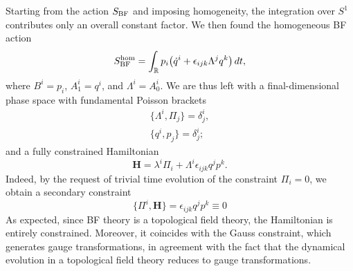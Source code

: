 \documentclass{article}
\numberwithin{equation}{section}
\theoremstyle{definition}
\begin{document}
\smallskip

Starting from the action $S_{\rm BF}$ and imposing homogeneity, the integration over $S^1$ contributes only an overall constant factor. We then found the homogeneous BF action
\begin{equation}
    S_{\rm BF}^{\rm hom}=\int_{\mathbb{R}} p_i\bigl(\dot q^i+\epsilon_{ijk}\Lambda^jq^k\bigr)\,dt,
\end{equation}
where $B^i=p_i$, $A^i_1=q^i$, and $\Lambda^i=A^i_0$. We are thus left with a final-dimensional phase space with fundamental Poisson brackets
\begin{equation}
    \begin{split}
        \{\Lambda^i,\Pi_j\}=\delta^i_j,\\
\{q^i,p_j\}=\delta^{i}_j;
    \end{split}
\end{equation}
and a fully constrained Hamiltonian
\begin{equation}
    \mathbf{H}=\lambda^i\Pi_i+\Lambda^i\epsilon_{ijk}q^jp^k.
\end{equation}
Indeed, by the request of trivial time evolution of the constraint $\Pi_i=0$, we obtain a secondary constraint
\begin{equation}
    \{\Pi^i,\mathbf{H}\}=\epsilon_{ijk}q^jp^k\equiv 0
\end{equation}
As expected, since BF theory is a topological field theory, the Hamiltonian is entirely constrained. Moreover, it coincides with the Gauss constraint, which generates gauge transformations, in agreement with the fact that the dynamical evolution in a topological field theory reduces to gauge transformations.

\medskip
\end{document}
